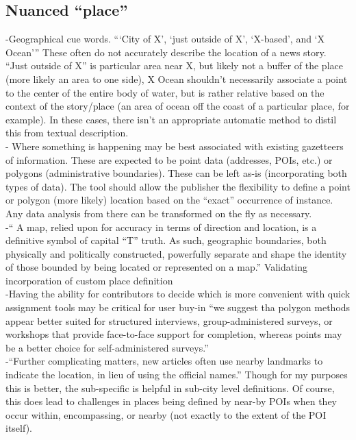 \subsection{Nuanced ``place''}
-{\color{orange}Geographical cue words. “‘City of X’, ‘just outside of X’, ‘X-based’, and ‘X Ocean’” \cite{Lieberman2010}}{\color{purple}These often do not accurately describe the location of a news story.  “Just outside of X” is particular area near X, but likely not a buffer of the place (more likely an area to one side), X Ocean shouldn’t necessarily associate a point to the center of the entire body of water, but is rather relative based on the context of the story/place (an area of ocean off the coast of a particular place, for example). In these cases, there isn’t an appropriate automatic method to distil this from textual description.\cite{Lieberman2010}}\\
-{\color{purple} Where something is happening may be best associated with existing gazetteers of information. These are expected to be point data (addresses, POIs, etc.) or polygons (administrative boundaries). These can be left as-is (incorporating both types of data). The tool should allow the publisher the flexibility to define a point or polygon (more likely) location based on the “exact” occurrence of instance. Any data analysis from there can be transformed on the fly as necessary.\cite{Brown2012}}\\
-{\color{orange}“ A map, relied upon for accuracy in terms of direction and location, is a definitive symbol of capital “T” truth. As such, geographic boundaries, both physically and politically constructed, powerfully separate and shape the identity of those bounded by being located or represented on a map.” Validating incorporation of custom place definition\cite{McQueenBaker2019}}\\
-{\color{purple}Having the ability for contributors to decide which is more convenient with quick assignment tools may be critical for user buy-in}{\color{orange} “we suggest tha polygon methods appear better suited for structured interviews, group-administered surveys, or workshops that provide face-to-face support for completion, whereas points may be a better choice for self-administered surveys.”\cite{Brown2012}}\\
-{\color{orange}“Further complicating matters, new articles often use nearby landmarks to indicate the location, in lieu of using the official names.”\cite{Lee2019}} {\color{purple} Though for my purposes this is better, the sub-specific is helpful in sub-city level definitions. Of course, this does lead to challenges in places being defined by near-by POIs when they occur within, encompassing, or nearby (not exactly to the extent of the POI itself).\cite{Lee2019}}\\

